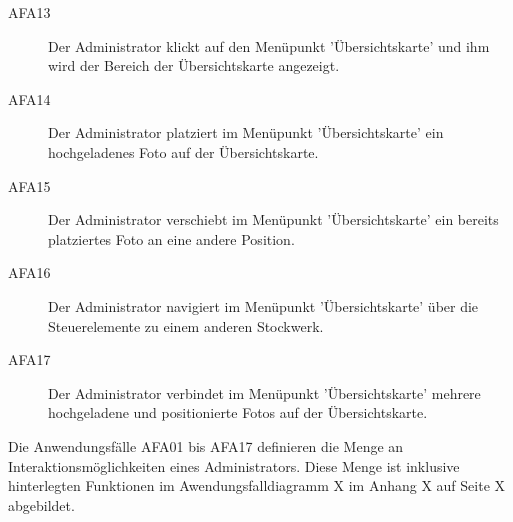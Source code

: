 \begin{description}
  \item[AFA13] Der Administrator klickt auf den Menüpunkt 'Übersichtskarte' und ihm wird der Bereich der Übersichtskarte angezeigt.
  \item[AFA14] Der Administrator platziert im Menüpunkt 'Übersichtskarte' ein hochgeladenes Foto auf der Übersichtskarte.
  \item[AFA15] Der Administrator verschiebt im Menüpunkt 'Übersichtskarte' ein bereits platziertes Foto an eine andere Position.
  \item[AFA16] Der Administrator navigiert im Menüpunkt 'Übersichtskarte' über die Steuerelemente zu einem anderen Stockwerk.
  \item[AFA17] Der Administrator verbindet im Menüpunkt 'Übersichtskarte' mehrere hochgeladene und positionierte Fotos auf der Übersichtskarte.
\end{description}

Die Anwendungsfälle AFA01 bis AFA17 definieren die Menge an Interaktionsmöglichkeiten eines Administrators. Diese Menge ist inklusive hinterlegten Funktionen im Awendungsfalldiagramm X im Anhang X auf Seite X abgebildet.